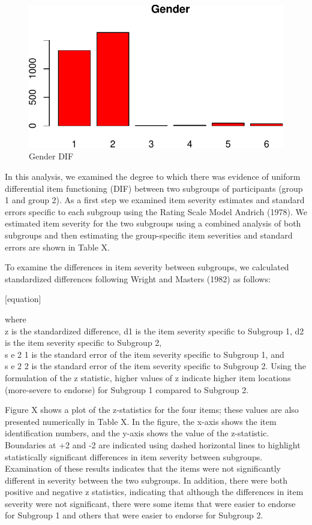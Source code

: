 \documentclass[
  letterpaper,
  DIV=11,
  numbers=noendperiod]{scrreport}
\begin{document}
\begin{figure}

{\centering \includegraphics{./results_files/figure-pdf/fig-gender-DIF-1.pdf}

}

\caption{\label{fig-gender-DIF}Gender DIF}

\end{figure}

In this analysis, we examined the degree to which there was evidence of
uniform differential item functioning (DIF) between two subgroups of
participants (group 1 and group 2). As a first step we examined item
severity estimates and standard errors specific to each subgroup using
the Rating Scale Model Andrich (1978). We estimated item severity for
the two subgroups using a combined analysis of both subgroups and then
estimating the group-specific item severities and standard errors are
shown in Table X.

To examine the differences in item severity between subgroups, we
calculated standardized differences following Wright and Masters (1982)
as follows:

{[}equation{]}

where\\
z is the standardized difference, d1 is the item severity specific to
Subgroup 1, d2 is the item severity specific to Subgroup 2,\\
s e 2 1 is the standard error of the item severity specific to Subgroup
1, and\\
s e 2 2 is the standard error of the item severity specific to Subgroup
2. Using the formulation of the z statistic, higher values of z indicate
higher item locations (more-severe to endorse) for Subgroup 1 compared
to Subgroup 2.

Figure X shows a plot of the z-statistics for the four items; these
values are also presented numerically in Table X. In the figure, the
x-axis shows the item identification numbers, and the y-axis shows the
value of the z-statistic. Boundaries at +2 and -2 are indicated using
dashed horizontal lines to highlight statistically significant
differences in item severity between subgroups. Examination of these
results indicates that the items were not significantly different in
severity between the two subgroups. In addition, there were both
positive and negative z statistics, indicating that although the
differences in item severity were not significant, there were some items
that were easier to endorse for Subgroup 1 and others that were easier
to endorse for Subgroup 2.
\end{document}

